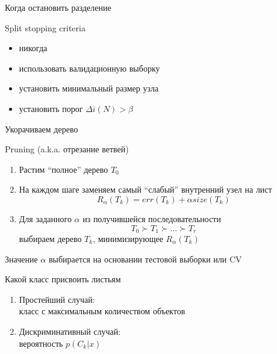 \documentclass[aspectratio=169]{beamer}
\begin{document}
\begin{frame}{Когда остановить разделение}

Split stopping criteria
\begin{itemize}
\item никогда
\item использовать валидационную выборку
\item установить минимальный размер узла
\item установить порог $\Delta i(N) > \beta$
\end{itemize}

\end{frame}

\begin{frame}{Укорачиваем дерево}

Pruning (a.k.a. отрезание ветвей)
\begin{enumerate}
\item Растим ``полное'' дерево $T_0$
\item На каждом шаге заменяем самый ``слабый'' внутренний узел на лист
\[
R_{\alpha}(T_k) = err(T_k) + \alpha size(T_k)
\]
\item Для заданного $\alpha $ из получившейся последовательности
\[
T_0 \succ T_1 \succ \ldots \succ T_r
\]
выбираем дерево $T_k$, минимизирующее $R_{\alpha}(T_k)$
\end{enumerate}
Значение $\alpha$  выбирается на основании тестовой выборки или CV

\end{frame}

\begin{frame}{Какой класс присвоить листьям}

\begin{enumerate}
\item Простейший случай: \\ класс с максимальным количеством объектов
\item Дискриминативный случай: \\ вероятность $p(C_k | x)$
\end{enumerate}

\end{frame}
\end{document}
